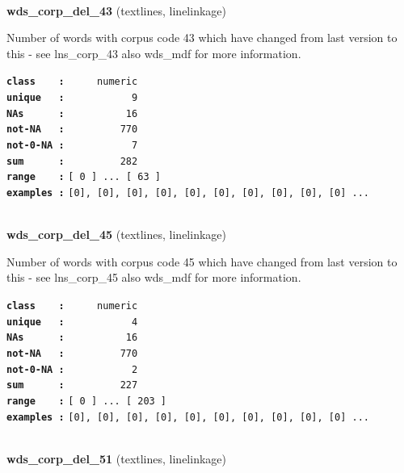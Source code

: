\documentclass[]{article}
\begin{document}
~

\textbf{wds\_corp\_del\_43} (textlines, linelinkage)

Number of words with corpus code 43 which have changed from last version
to this - see lns\_corp\_43 also wds\_mdf for more information.

\textbf{\texttt{class\ \ \ \ :}} \texttt{~~~~~numeric}\\
\textbf{\texttt{unique\ \ \ :}} \texttt{~~~~~~~~~~~9}\\
\textbf{\texttt{NAs\ \ \ \ \ \ :}} \texttt{~~~~~~~~~~16}\\
\textbf{\texttt{not-NA\ \ \ :}} \texttt{~~~~~~~~~770}\\
\textbf{\texttt{not-0-NA\ :}} \texttt{~~~~~~~~~~~7}\\
\textbf{\texttt{sum\ \ \ \ \ \ :}} \texttt{~~~~~~~~~282}\\
\textbf{\texttt{range\ \ \ \ :}}
\texttt{{[}\ 0\ {]}\ ...\ {[}\ 63\ {]}}\\
\textbf{\texttt{examples\ :}}
\texttt{{[}0{]},\ {[}0{]},\ {[}0{]},\ {[}0{]},\ {[}0{]},\ {[}0{]},\ {[}0{]},\ {[}0{]},\ {[}0{]},\ {[}0{]}\ ...}\\

~

\textbf{wds\_corp\_del\_45} (textlines, linelinkage)

Number of words with corpus code 45 which have changed from last version
to this - see lns\_corp\_45 also wds\_mdf for more information.

\textbf{\texttt{class\ \ \ \ :}} \texttt{~~~~~numeric}\\
\textbf{\texttt{unique\ \ \ :}} \texttt{~~~~~~~~~~~4}\\
\textbf{\texttt{NAs\ \ \ \ \ \ :}} \texttt{~~~~~~~~~~16}\\
\textbf{\texttt{not-NA\ \ \ :}} \texttt{~~~~~~~~~770}\\
\textbf{\texttt{not-0-NA\ :}} \texttt{~~~~~~~~~~~2}\\
\textbf{\texttt{sum\ \ \ \ \ \ :}} \texttt{~~~~~~~~~227}\\
\textbf{\texttt{range\ \ \ \ :}}
\texttt{{[}\ 0\ {]}\ ...\ {[}\ 203\ {]}}\\
\textbf{\texttt{examples\ :}}
\texttt{{[}0{]},\ {[}0{]},\ {[}0{]},\ {[}0{]},\ {[}0{]},\ {[}0{]},\ {[}0{]},\ {[}0{]},\ {[}0{]},\ {[}0{]}\ ...}\\

~

\textbf{wds\_corp\_del\_51} (textlines, linelinkage)
\end{document}
